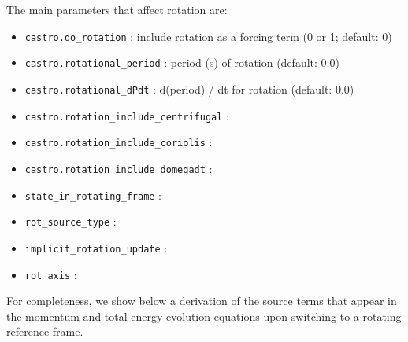 The main parameters that affect rotation are:
\begin{itemize}

\item {\tt castro.do\_rotation} : include rotation as a forcing term
  (0 or 1; default: 0) 

\item {\tt castro.rotational\_period} : period (s) of rotation (default:  0.0)

\item {\tt castro.rotational\_dPdt} : d(period) / dt for rotation (default: 0.0)

\item {\tt castro.rotation\_include\_centrifugal} :

\item {\tt castro.rotation\_include\_coriolis} :

\item {\tt castro.rotation\_include\_domegadt} :

\item {\tt state\_in\_rotating\_frame} :

\item {\tt rot\_source\_type} :

\item {\tt implicit\_rotation\_update} :

\item {\tt rot\_axis} :

\end{itemize}

For completeness, we show below a derivation of the source terms that
appear in the momentum and total energy evolution equations upon
switching to a rotating reference frame.


